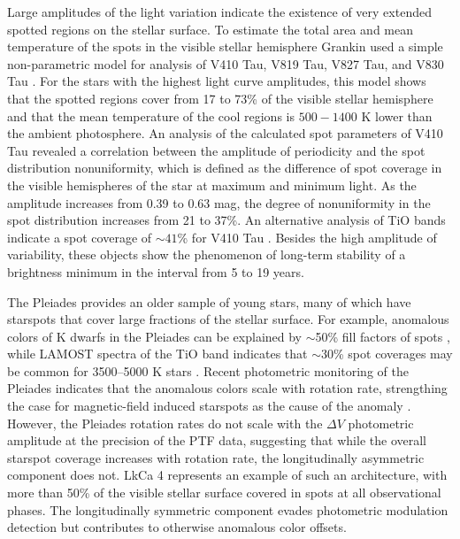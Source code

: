 \documentclass[twocolumn]{emulateapj}%
\begin{document}
Large amplitudes of the light variation indicate the existence of very extended spotted regions on the stellar surface. To estimate the total area and mean temperature of the spots in the visible stellar hemisphere Grankin used a simple non-parametric model for analysis of V410 Tau, V819 Tau, V827 Tau, and V830 Tau \citep{grankin98,grankin99}.  For the stars with the highest light curve amplitudes, this model shows that the spotted regions cover from 17 to 73\% of the visible stellar hemisphere and that the mean temperature of the cool regions is $500-1400$ K lower than the ambient photosphere.  An analysis of the calculated spot parameters of V410 Tau revealed a correlation between the amplitude of periodicity and the spot distribution
nonuniformity, which is defined as the difference of spot coverage in the visible hemispheres of the star at maximum and minimum light. As the amplitude increases from 0.39 to 0.63 mag, the degree of nonuniformity in the spot distribution increases from 21 to 37\%.  An alternative analysis of TiO bands indicate a spot coverage of $\sim 41$\% for V410 Tau \citep{petrov94}.  Besides the high amplitude of variability, these objects show the phenomenon of long-term stability of a brightness minimum in the interval from 5 to 19 years.


The Pleiades provides an older \citep[$\sim125$ Myr,][]{stauffer98} sample of young stars, many of which have starspots that cover large fractions of the stellar surface.  For example, anomalous colors of K dwarfs in the Pleiades can be explained by $\sim$50\% fill factors of spots \citep{stauffer03}, while LAMOST spectra of the TiO band indicates that $\sim 30$\% spot coverages may be common for 3500--5000 K stars \citep{fang2016}.  Recent photometric monitoring of the Pleiades indicates that the anomalous colors scale with rotation rate, strengthing the case for magnetic-field induced starspots as the cause of the anomaly \citep{covey16}.  However, the \citet{covey16} Pleiades rotation rates do not scale with the $\Delta V$ photometric amplitude at the precision of the PTF data, suggesting that while the overall starspot coverage increases with rotation rate, the longitudinally asymmetric component does not.  LkCa 4 represents an example of such an architecture, with more than  50\% of the visible stellar surface covered in spots at all observational phases. The longitudinally symmetric component evades photometric modulation detection but contributes to otherwise anomalous color offsets.
\end{document}
